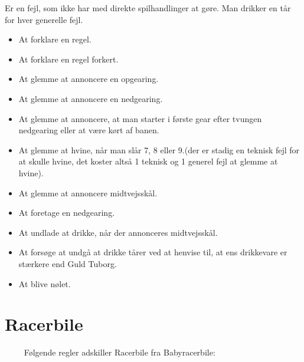 \documentclass[12pt]{article}
\begin{document}
Er en fejl, som ikke har med direkte spilhandlinger at gøre. Man drikker en tår for hver generelle fejl.

\begin{itemize}
	\item At forklare en regel.
	\item At forklare en regel forkert.
	\item At glemme at annoncere en opgearing.
	\item At glemme at annoncere en nedgearing.
	\item At glemme at annoncere, at man starter i første gear efter tvungen nedgearing eller at være kørt af banen.
	\item At glemme at hvine, når man slår 7, 8 eller 9.(der er stadig en teknisk fejl for at skulle hvine, det koster altså 1 teknisk og 1 generel fejl at glemme at hvine).
	\item At glemme at annoncere midtvejsskål.
	\item At foretage en nedgearing.
	\item At undlade at drikke, når der annonceres midtvejsskål.
	\item At forsøge at undgå at drikke tårer ved at henvise til, at ens drikkevare er stærkere end Guld Tuborg.
	\item At blive nølet.
\end{itemize}

\newpage

\section*{Racerbile}

$\qquad$  Følgende regler adskiller Racerbile fra Babyracerbile:
\end{document}
